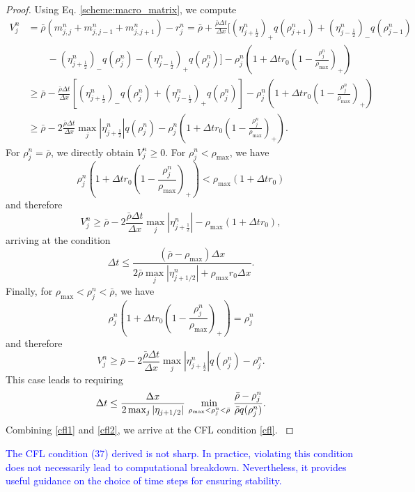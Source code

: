 \documentclass{article}
\begin{document}
\begin{proof}
{Using Eq. \eqref{scheme:macro_matrix}, we compute
\begin{equation*}
\begin{split}
    V^n_j &= \bar{\rho}(m_{j,j}^n + m_{j,j-1}^n + m_{j,j+1}^n) -r_j^n  = \bar{\rho} + \frac{\bar{\rho} \Delta t}{\Delta x} [(\eta_{j+\frac12}^n)_+ q(\rho_{j+1}^n) + (\eta_{j-\frac12}^n)_- q(\rho_{j-1}^n) \\ & \qquad - (\eta_{j+\frac12}^n)_- q(\rho_j^n) - (\eta_{j-\frac12}^n)_+ q(\rho_j^n) ] - \rho_j^n ( 1+ \Delta t r_0 ( 1 - \frac{\rho_j^n}{\rho_{\max}})_+) \\
    & \geq \bar{\rho} - \frac{\bar{\rho} \Delta t}{\Delta x} [ (\eta_{j+\frac12}^n)_- q(\rho_j^n) + (\eta_{j-\frac12}^n)_+ q(\rho_j^n) ] - \rho_j^n ( 1+ \Delta t r_0 ( 1 - \frac{\rho_j^n}{\rho_{\max}})_+)\\
    & \geq \bar{\rho} - 2\frac{\bar{\rho} \Delta t}{\Delta x} \max_j |\eta_{j+\frac12}^n| q(\rho_j^n) - \rho_j^n ( 1+ \Delta t r_0 ( 1 - \frac{\rho_j^n}{\rho_{\max}})_+).
\end{split}
\end{equation*}
\noindent For $\rho_j^n = \bar{\rho}$, we directly obtain $V_j^n \geq 0$. For $\rho_j^n <\rho_{\max}$, we have 
\begin{equation*}
\rho_j^n ( 1+ \Delta t r_0 ( 1 - \frac{\rho_j^n}{\rho_{\max}})_+) < \rho_{\max} (1+ \Delta t r_0)
\end{equation*}
and therefore
\begin{equation*}
V_j^n \geq \bar{\rho} - 2\frac{\bar{\rho} \Delta t}{\Delta x} \max_j |\eta_{j+\frac12}^n| - \rho_{\max} (1+ \Delta t r_0), 
\end{equation*}
arriving at the condition 
\begin{equation}\label{cfl1}
\Delta t \leq  \frac{(\bar{\rho} - \rho_{\max})\Delta x}{2 \bar{\rho} \max_j |\eta_{j+1/2}^n| + \rho_{\max} r_0 \Delta x}.
\end{equation}
Finally, for $\rho_{\max} < \rho_j^n < \bar{\rho}$, we have
\begin{equation*}
\rho_j^n ( 1+ \Delta t r_0 ( 1 - \frac{\rho_j^n}{\rho_{\max}})_+) = \rho_j^n 
\end{equation*}
and therefore
\begin{equation*}
V_j^n \geq \bar{\rho} - 2\frac{\bar{\rho} \Delta t}{\Delta x} \max_j |\eta_{j+\frac12}^n|q(\rho_j^n) - \rho_j^n. 
\end{equation*}
This case leads to requiring
\begin{equation}\label{cfl2}
{
\Delta t \leq \frac{\Delta x}{2 \max_j |\eta_{j+1/2}|}\ \underset{ \rho_{\max} < \rho_j^n < \bar{\rho}}{\min} \ \frac{\bar{\rho} - \rho_j^n}{\bar{\rho} q(\rho_j^n)}.}
\end{equation}
Combining \eqref{cfl1} and \eqref{cfl2}, we arrive at the CFL condition \eqref{cfl}.
}
\end{proof}
\textcolor{blue}{The CFL condition (37) derived is not sharp. In practice, violating this condition does not necessarily lead to computational breakdown. Nevertheless, it provides useful guidance on the choice of time steps for ensuring stability.}
\end{document}
